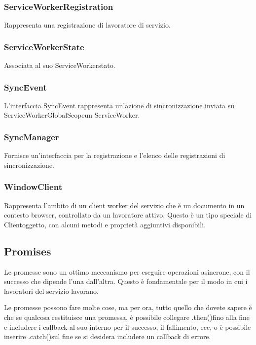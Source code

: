 \documentclass[italian]{article}
\begin{document}
\subsubsection{ServiceWorkerRegistration}
Rappresenta una registrazione di lavoratore di servizio.
\subsubsection{ServiceWorkerState}
Associata al suo ServiceWorkerstato.
\subsubsection{SyncEvent}
L'interfaccia SyncEvent rappresenta un'azione di sincronizzazione inviata su ServiceWorkerGlobalScopeun ServiceWorker.
\subsubsection{SyncManager}
Fornisce un'interfaccia per la registrazione e l'elenco delle registrazioni di sincronizzazione.
\subsubsection{WindowClient}
Rappresenta l'ambito di un client worker del servizio che è un documento in un contesto browser, controllato da un lavoratore attivo. Questo è un tipo speciale di Clientoggetto, con alcuni metodi e proprietà aggiuntivi disponibili.

\subsection{Promises}
Le promesse sono un ottimo meccanismo per eseguire operazioni asincrone, con il successo che dipende l'una dall'altra. Questo è fondamentale per il modo in cui i lavoratori del servizio lavorano. 

Le promesse possono fare molte cose, ma per ora, tutto quello che dovete sapere è che se qualcosa restituisce una promessa, è possibile collegare .then()fino alla fine e includere i callback al suo interno per il successo, il fallimento, ecc, o è possibile inserire .catch()sul fine se si desidera includere un callback di errore.
\end{document}
